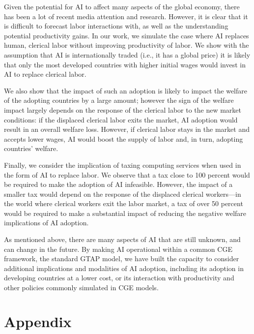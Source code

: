 \documentclass[
  authoryear,
  doubleblind]{elsarticle}
\begin{document}
Given the potential for AI to affect many aspects of the global economy,
there has been a lot of recent media attention and research. However, it
is clear that it is difficult to forecast labor interactions with, as
well as the understanding potential productivity gains. In our work, we
simulate the case where AI replaces human, clerical labor without
improving productivity of labor. We show with the assumption that AI is
internationally traded (i.e., it has a global price) it is likely that
only the most developed countries with higher initial wages would invest
in AI to replace clerical labor.

We also show that the impact of such an adoption is likely to impact the
welfare of the adopting countries by a large amount; however the sign of
the welfare impact largely depends on the response of the clerical labor
to the new market conditions: if the displaced clerical labor exits the
market, AI adoption would result in an overall welfare loss. However, if
clerical labor stays in the market and accepts lower wages, AI would
boost the supply of labor and, in turn, adopting countries' welfare.

Finally, we consider the implication of taxing computing services when
used in the form of AI to replace labor. We observe that a tax close to
100 percent would be required to make the adoption of AI infeasible.
However, the impact of a smaller tax would depend on the response of the
displaced clerical workers---in the world where clerical workers exit
the labor market, a tax of over 50 percent would be required to make a
substantial impact of reducing the negative welfare implications of AI
adoption.

As mentioned above, there are many aspects of AI that are still unknown,
and can change in the future. By making AI operational within a common
CGE framework, the standard GTAP model, we have built the capacity to
consider additional implications and modalities of AI adoption,
including its adoption in developing countries at a lower cost, or its
interaction with productivity and other policies commonly simulated in
CGE models.

\setcounter{section}{0}
\renewcommand{\thesection}{\Alph{section}}

\setcounter{table}{0}
\renewcommand{\thetable}{A\arabic{table}}

\setcounter{figure}{0}
\renewcommand{\thefigure}{A\arabic{figure}}

\newpage

\section{Appendix}\label{appendix}
\end{document}
